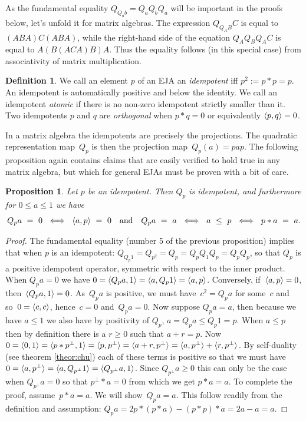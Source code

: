 \documentclass[submission,copyright,creativecommons]{eptcs}
\newcounter{main}
\newtheorem{proposition}[main]{Proposition}
\theoremstyle{definition}
\newtheorem{definition}[main]{Definition}
\DeclarePairedDelimiter{\inn}{\langle}{\rangle}
\begin{document}
As the fundamental equality $Q_{Q_ab} = Q_aQ_bQ_a$ will be important
in the proofs below, let's unfold it for matrix algebras.
The expression $Q_{Q_AB}C$ is equal to $(ABA)C(ABA)$, while
the right-hand side of the equation $Q_AQ_BQ_AC$ is equal to
$A(B(ACA)B)A$. Thus the equality follows (in this special case) from
associativity of matrix multiplication.


\begin{definition}
	We call an element $p$ of an EJA an \emph{idempotent} iff $p^2:=p*p=p$. An idempotent is automatically positive and below the identity. We call an idempotent \emph{atomic} if there is no non-zero idempotent strictly smaller than it. Two idempotents $p$ and $q$ are \emph{orthogonal} when $p*q=0$ or equivalently $\inn{p,q}=0$.
\end{definition}

In a matrix algebra the idempotents are precisely the projections.
The quadratic representation map~$Q_p$ is then the projection map~$Q_p(a) = pap$.
The following proposition again contains claims that are easily verified to hold true in any
matrix algebra, but which for general EJAs must be proven with a bit of care.

\begin{proposition}\label{prop:EJAidempotent}
    Let $p$ be an idempotent. Then $Q_p$ is idempotent, and furthermore for $0\leq a \leq 1$
    we have
    \begin{equation*}
        Q_pa\ =\ 0 \ \iff \ \inn{a,p}\ =\ 0 \quad\text{and} \quad Q_pa \ =\  a \ \iff\  a\ \leq\ p\ \iff\  p*a\ =\ a.
    \end{equation*}
\end{proposition}
\begin{proof}
The fundamental equality (number 5 of the previous proposition)
implies that when $p$ is an idempotent: $Q_{Q_p 1}=Q_{p^2}=Q_p =
Q_pQ_1Q_p=Q_pQ_p$, so that $Q_p$ is a positive idempotent operator,
symmetric with respect to the inner product. When $Q_pa=0$ we have
$0 = \inn{Q_pa,1}=\inn{a,Q_p1} = \inn{a,p}$.
Conversely, if~$\inn{a,p} = 0$,
    then~$\inn{Q_p a, 1} = 0$.
As~$Q_p a$ is positive,
    we must have~$c^2 = Q_pa$ for some~$c$
    and so~$0 = \inn{c,c}$, hence~$c=0$ and~$Q_p a= 0$.
    Now suppose $Q_pa=a$,
then because we have $a\leq 1$ we also have by positivity of $Q_p$,
$a=Q_pa\leq Q_p1=p$. When $a\leq p$ then by definition there is a
$r\geq 0$ such that $a+r=p$. Now~$0=\inn{0,1}=\inn{p*p^\perp,1} =
\inn{p,p^\perp} = \inn{a+r,p^\perp} = \inn{a,p^\perp} + \inn{r,p^\perp}$.
By self-duality (see theorem \ref{theor:chu}) each of these terms
is positive so that we must have $0=\inn{a,p^\perp}=\inn{a,Q_{p^\perp}1}
= \inn{Q_{p^\perp}a,1}$. Since $Q_{p^\perp}a\geq 0$ this can only
be the case when $Q_{p^\perp}a = 0$ so that $p^\perp*a=0$ from which
we get $p*a = a$.
To complete the proof, assume~$p * a= a$.
We will show~$Q_p a = a$.
This follow readily from the definition and assumption: $
    Q_p a = 2 p * (p * a) - (p * p ) * a
    = 2 a - a = a $.
\end{proof}
\end{document}
